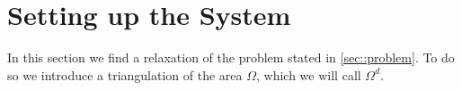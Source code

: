 
\section{\label{sec::setupSystem}Setting up the System}
In this section we find a relaxation of the problem stated in \ref{sec::problem}. To do so we introduce a triangulation of the area $\Omega$, which we will call $\Omega^d$.